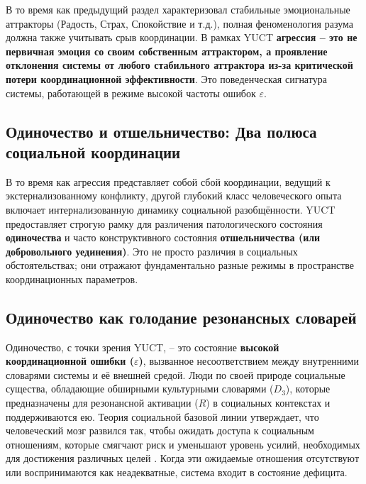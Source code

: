 \documentclass[12pt,a4paper]{article}
\begin{document}
	В то время как предыдущий раздел характеризовал стабильные эмоциональные аттракторы (Радость, Страх, Спокойствие и т.д.), полная феноменология разума должна также учитывать срыв координации. В рамках YUCT \textbf{агрессия – это не первичная эмоция со своим собственным аттрактором, а проявление отклонения системы от любого стабильного аттрактора из-за критической потери координационной эффективности}. Это поведенческая сигнатура системы, работающей в режиме высокой частоты ошибок \(\varepsilon\).
	
	\subsection{Одиночество и отшельничество: Два полюса социальной координации}
	
	В то время как агрессия представляет собой сбой координации, ведущий к экстернализованному конфликту, другой глубокий класс человеческого опыта включает интернализованную динамику социальной разобщённости. YUCT предоставляет строгую рамку для различения патологического состояния \textbf{одиночества} и часто конструктивного состояния \textbf{отшельничества (или добровольного уединения)}. Это не просто различия в социальных обстоятельствах; они отражают фундаментально разные режимы в пространстве координационных параметров.
	
	\subsection{Одиночество как голодание резонансных словарей}
	
	Одиночество, с точки зрения YUCT, – это состояние \textbf{высокой координационной ошибки (\(\varepsilon\))}, вызванное несоответствием между внутренними словарями системы и её внешней средой. Люди по своей природе социальные существа, обладающие обширными культурными словарями (\(D_3\)), которые предназначены для резонансной активации (\(R\)) в социальных контекстах и поддерживаются ею. Теория социальной базовой линии утверждает, что человеческий мозг развился так, чтобы ожидать доступа к социальным отношениям, которые смягчают риск и уменьшают уровень усилий, необходимых для достижения различных целей \cite{Beckes2015}. Когда эти ожидаемые отношения отсутствуют или воспринимаются как неадекватные, система входит в состояние дефицита.
	
\end{document}
